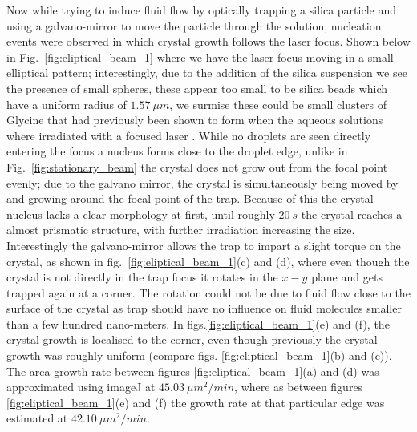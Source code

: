 Now while trying to induce fluid flow by optically trapping a silica particle and 
using a galvano-mirror to move the particle through the solution, nucleation events
were observed in which crystal growth follows the laser focus. Shown below in Fig.~\ref{fig:eliptical_beam_1} where we have the laser focus moving in a small elliptical 
pattern; interestingly, due to the addition of the silica suspension we see the presence
of small spheres, these appear too small to be silica beads which have a uniform radius
of $1.57\ \mu m$, we surmise these could be small clusters of Glycine that had previously
been shown to form when the aqueous solutions where irradiated with a focused laser
\cite{Tsuboi2009, Gowayed2021}. While no droplets are seen directly entering the focus a 
nucleus forms close to the droplet edge, unlike in Fig.~\ref{fig:stationary_beam} the 
crystal does not grow out from the focal point evenly; due to the galvano mirror, 
the crystal is simultaneously being moved by and growing around the focal point of 
the trap. Because of this the crystal nucleus lacks a clear morphology at first, 
until roughly $20\ s$ the crystal reaches a almost prismatic structure, with further 
irradiation increasing the size. Interestingly the galvano-mirror allows the trap to 
impart a slight torque on the crystal, as shown in fig.~\ref{fig:eliptical_beam_1}(c) 
and (d), where even though the crystal is not directly in the trap focus it rotates in 
the $x-y$ plane and gets trapped again at a corner. The rotation could not be due to fluid
flow close to the surface of the crystal as trap should have no influence on fluid molecules
smaller than a few hundred nano-meters. In figs.\ref{fig:eliptical_beam_1}(e) and (f), 
the crystal growth is localised to the corner, even though previously the crystal growth 
was roughly uniform (compare figs. \ref{fig:eliptical_beam_1}(b) and (c)). The area growth
rate between figures \ref{fig:eliptical_beam_1}(a) and (d) was approximated using imageJ at
$45.03\ \mu m^2 /min$, where as between figures \ref{fig:eliptical_beam_1}(e) and (f) the 
growth rate at that particular edge was estimated at $42.10\ \mu m^2/min$. 
